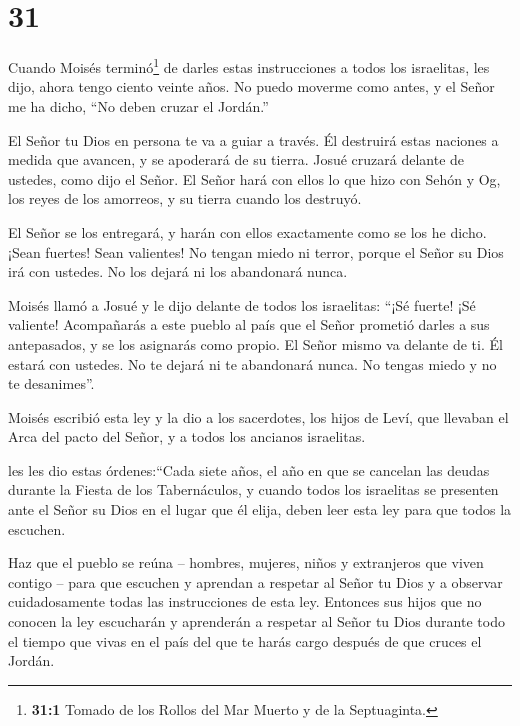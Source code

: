 \hypertarget{section-30}{%
\section{31}\label{section-30}}

 Cuando Moisés terminó\footnote{\textbf{31:1} Tomado de los
  Rollos del Mar Muerto y de la Septuaginta.} de darles estas
instrucciones a todos los israelitas,  les dijo, ahora tengo
ciento veinte años. No puedo moverme como antes, y el Señor me ha dicho,
``No deben cruzar el Jordán.''

 El Señor tu Dios en persona te va a guiar a través. Él
destruirá estas naciones a medida que avancen, y se apoderará de su
tierra. Josué cruzará delante de ustedes, como dijo el Señor.
 El Señor hará con ellos lo que hizo con Sehón y Og, los
reyes de los amorreos, y su tierra cuando los destruyó.

 El Señor se los entregará, y harán con ellos exactamente
como se los he dicho.  ¡Sean fuertes! Sean valientes! No
tengan miedo ni terror, porque el Señor su Dios irá con ustedes. No los
dejará ni los abandonará nunca.

 Moisés llamó a Josué y le dijo delante de todos los
israelitas: ``¡Sé fuerte! ¡Sé valiente! Acompañarás a este pueblo al
país que el Señor prometió darles a sus antepasados, y se los asignarás
como propio.  El Señor mismo va delante de ti. Él estará con
ustedes. No te dejará ni te abandonará nunca. No tengas miedo y no te
desanimes''.

 Moisés escribió esta ley y la dio a los sacerdotes, los
hijos de Leví, que llevaban el Arca del pacto del Señor, y a todos los
ancianos israelitas.

 les les dio estas órdenes:``Cada siete años, el año en que
se cancelan las deudas durante la Fiesta de los Tabernáculos,
 y cuando todos los israelitas se presenten ante el Señor
su Dios en el lugar que él elija, deben leer esta ley para que todos la
escuchen.

 Haz que el pueblo se reúna -- hombres, mujeres, niños y
extranjeros que viven contigo -- para que escuchen y aprendan a respetar
al Señor tu Dios y a observar cuidadosamente todas las instrucciones de
esta ley.  Entonces sus hijos que no conocen la ley
escucharán y aprenderán a respetar al Señor tu Dios durante todo el
tiempo que vivas en el país del que te harás cargo después de que cruces
el Jordán.

